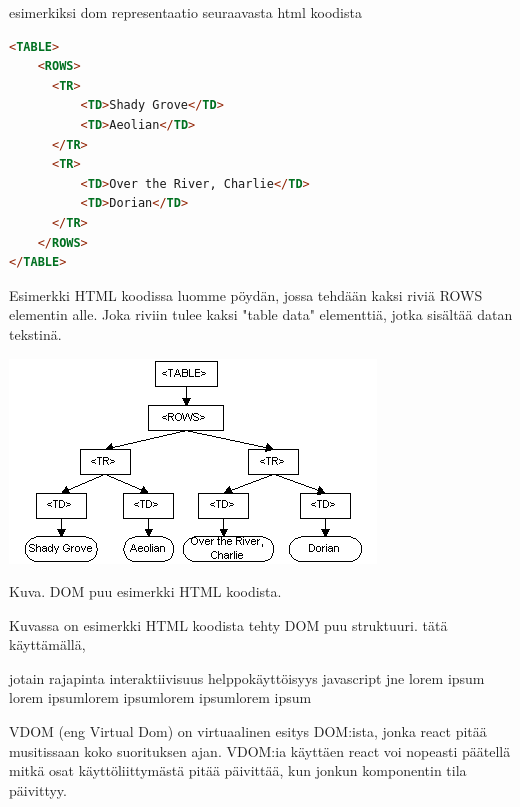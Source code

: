 esimerkiksi dom representaatio seuraavasta html koodista

    
\begin{tcolorbox}
\begin{lstlisting}[language=html]
<TABLE>
    <ROWS> 
      <TR> 
          <TD>Shady Grove</TD>
          <TD>Aeolian</TD> 
      </TR> 
      <TR>
          <TD>Over the River, Charlie</TD>
          <TD>Dorian</TD> 
      </TR> 
    </ROWS>
</TABLE>
\end{lstlisting}
\end{tcolorbox}


Esimerkki HTML koodissa luomme pöydän, jossa tehdään kaksi riviä ROWS elementin alle. 
Joka riviin tulee kaksi "table data"{} elementtiä, jotka sisältää datan tekstinä.
\bigskip



\includegraphics{./src/public/oppar/dom.png}

Kuva\getImgCount .{} DOM puu esimerkki HTML koodista. 
\medskip

Kuvassa on esimerkki HTML koodista tehty DOM puu struktuuri.
tätä käyttämällä, 

jotain rajapinta interaktiivisuus helppokäyttöisyys javascript jne lorem ipsum lorem ipsumlorem ipsumlorem ipsumlorem ipsum

\bigskip




VDOM (eng Virtual Dom) on virtuaalinen esitys DOM:ista, jonka react pitää musitissaan koko suorituksen ajan.
VDOM:ia käyttäen react voi nopeasti päätellä mitkä osat käyttöliittymästä pitää päivittää, kun jonkun komponentin tila päivittyy. 
\medskip



